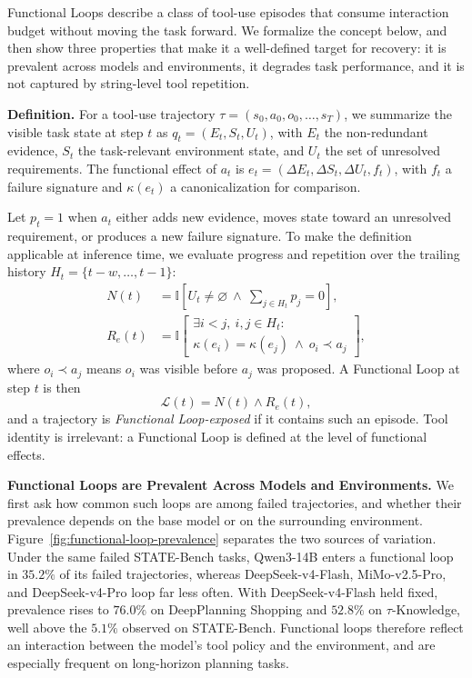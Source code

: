 \documentclass[letterpaper]{article}
\begin{document}
Functional Loops describe a class of tool-use episodes that consume interaction budget without moving the task forward. We formalize the concept below, and then show three properties that make it a well-defined target for recovery: it is prevalent across models and environments, it degrades task performance, and it is not captured by string-level tool repetition.

\noindent\textbf{Definition.}\quad
For a tool-use trajectory $\tau=(s_0,a_0,o_0,\ldots,s_T)$, we summarize the visible task state at step $t$ as $q_t=(E_t,S_t,U_t)$, with $E_t$ the non-redundant evidence, $S_t$ the task-relevant environment state, and $U_t$ the set of unresolved requirements. The functional effect of $a_t$ is $e_t=(\Delta E_t,\Delta S_t,\Delta U_t,f_t)$, with $f_t$ a failure signature and $\kappa(e_t)$ a canonicalization for comparison.

Let $p_t=1$ when $a_t$ either adds new evidence, moves state toward an unresolved requirement, or produces a new failure signature. To make the definition applicable at inference time, we evaluate progress and repetition over the trailing history $H_t=\{t-w,\ldots,t-1\}$:
\begin{equation}
\begin{aligned}
N(t)&=\mathbb{I}\!\left[U_t\neq\varnothing\ \land\ \sum_{j\in H_t}p_j=0\right],\\
R_e(t)&=\mathbb{I}\!\left[
\substack{\exists i<j,\ i,j\in H_t:\\
\kappa(e_i)=\kappa(e_j)\ \land\ o_i\prec a_j}\right],
\end{aligned}
\end{equation}
where $o_i\prec a_j$ means $o_i$ was visible before $a_j$ was proposed. A Functional Loop at step $t$ is then
\begin{equation}
\mathcal{L}(t)=N(t)\land R_e(t),
\label{eq:functional-loop}
\end{equation}
and a trajectory is \emph{Functional Loop-exposed} if it contains such an episode. Tool identity is irrelevant: a Functional Loop is defined at the level of functional effects.

\noindent\textbf{Functional Loops are Prevalent Across Models and Environments.}\quad
We first ask how common such loops are among failed trajectories, and whether their prevalence depends on the base model or on the surrounding environment. Figure~\ref{fig:functional-loop-prevalence} separates the two sources of variation. Under the same failed STATE-Bench tasks, Qwen3-14B enters a functional loop in $35.2\%$ of its failed trajectories, whereas DeepSeek-v4-Flash, MiMo-v2.5-Pro, and DeepSeek-v4-Pro loop far less often. With DeepSeek-v4-Flash held fixed, prevalence rises to $76.0\%$ on DeepPlanning Shopping and $52.8\%$ on $\tau$-Knowledge, well above the $5.1\%$ observed on STATE-Bench. Functional loops therefore reflect an interaction between the model's tool policy and the environment, and are especially frequent on long-horizon planning tasks.
\end{document}
